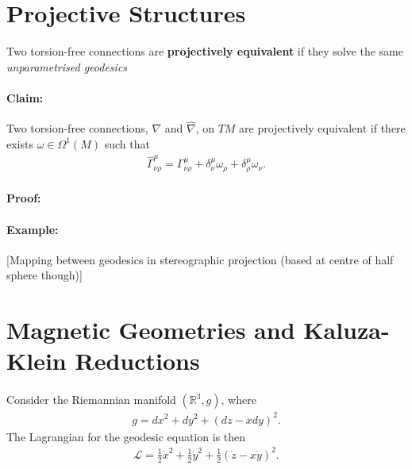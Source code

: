 \documentclass[11pt,fleqn]{report}
\begin{document}
\section{Projective Structures}


\begin{definition}
	Two torsion-free connections are \textbf{projectively equivalent} if they solve the same \textit{unparametrised geodesics}
\end{definition}


\paragraph{Claim:} Two torsion-free connections, $\nabla$ and $\widehat{\nabla}$, on $TM$  are projectively equivalent if there exists $\omega \in \Omega^1(M)$ such that
	\begin{align}
		\widehat{\Gamma}^\mu_{\nu\rho} = \Gamma^\mu_{\nu \rho} + \delta^\mu_\nu \omega_\rho + \delta^\mu_\rho \omega_\nu.
	\end{align}
	
\paragraph{Proof:}


\paragraph{Example:} [Mapping between geodesics in stereographic projection (based at centre of half sphere though)]

\section{Magnetic Geometries and Kaluza-Klein Reductions}

\paragraph{} Consider the Riemannian manifold $(\mathbb{R}^3,g)$, where
	\begin{align}
		g = dx^2 + dy^2 + (dz - xdy)^2.
	\end{align}
The Lagrangian for the geodesic equation is then
	\begin{align}
		\mathcal{L} = \tfrac{1}{2} \dot{x}^2 + \tfrac{1}{2} \dot{y}^2 + \tfrac{1}{2}(\dot{z} - x\dot{y})^2.
	\end{align}
	
\end{document}
